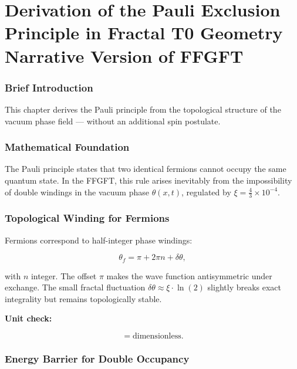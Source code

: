 \chapter{Derivation of the Pauli Exclusion Principle in Fractal T0 Geometry  Narrative Version of FFGFT}


	
	\subsection*{Brief Introduction}
	
	This chapter derives the Pauli principle from the topological structure of the vacuum phase field — without an additional spin postulate.
	
	\subsection*{Mathematical Foundation}
	
	The Pauli principle states that two identical fermions cannot occupy the same quantum state. In the FFGFT, this rule arises inevitably from the impossibility of double windings in the vacuum phase \(\theta(x,t)\), regulated by \(\xi = \frac{4}{3} \times 10^{-4}\).
	
	\subsection*{Topological Winding for Fermions}
	
	Fermions correspond to half-integer phase windings:
	
	\begin{equation}
		\theta_f = \pi + 2\pi n + \delta \theta,
	\end{equation}
	
	with \(n\) integer. The offset \(\pi\) makes the wave function antisymmetric under exchange. The small fractal fluctuation \(\delta \theta \approx \xi \cdot \ln(2)\) slightly breaks exact integrality but remains topologically stable.
	
	\textbf{Unit check:}
	
	\begin{equation}
		[\theta_f] = \text{dimensionless}.
	\end{equation}
	
	\subsection*{Energy Barrier for Double Occupancy}
	
